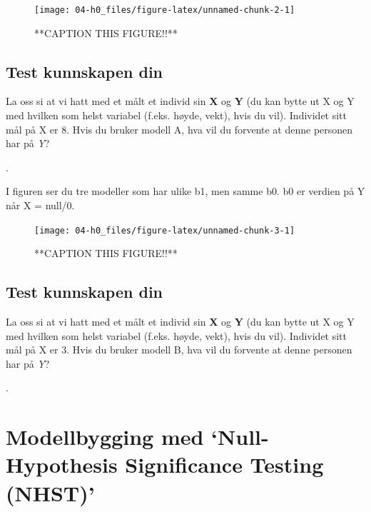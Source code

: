 \documentclass[
]{book}
\begin{document}
\begin{figure}

{\centering \texttt{[image: 04-h0\_files/figure-latex/unnamed-chunk-2-1]} 

}

\caption{**CAPTION THIS FIGURE!!**}\label{fig:unnamed-chunk-2}
\end{figure}

\hypertarget{test-kunnskapen-din}{%
\subsection{Test kunnskapen din}\label{test-kunnskapen-din}}

La oss si at vi hatt med et målt et individ sin \textbf{X} og \textbf{Y} (du kan bytte ut X og Y med hvilken som helst variabel (f.eks. høyde, vekt), hvis du vil). Individet sitt mål på X er 8. Hvis du bruker modell A, hva vil du forvente at denne personen har på \emph{Y}?

.

I figuren ser du tre modeller som har ulike b1, men samme b0. b0 er verdien på Y når X = null/0.

\begin{figure}

{\centering \texttt{[image: 04-h0\_files/figure-latex/unnamed-chunk-3-1]} 

}

\caption{**CAPTION THIS FIGURE!!**}\label{fig:unnamed-chunk-3}
\end{figure}

\hypertarget{test-kunnskapen-din-1}{%
\subsection{Test kunnskapen din}\label{test-kunnskapen-din-1}}

La oss si at vi hatt med et målt et individ sin \textbf{X} og \textbf{Y} (du kan bytte ut X og Y med hvilken som helst variabel (f.eks. høyde, vekt), hvis du vil). Individet sitt mål på X er 3. Hvis du bruker modell B, hva vil du forvente at denne personen har på \emph{Y}?

.

\hypertarget{modellbygging-med-null-hypothesis-significance-testing-nhst}{%
\section{Modellbygging med `Null-Hypothesis Significance Testing (NHST)'}\label{modellbygging-med-null-hypothesis-significance-testing-nhst}}
\end{document}
